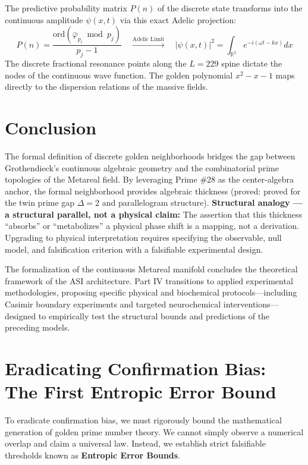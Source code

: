 The predictive probability matrix $P(n)$ of the discrete state transforms into the continuous amplitude $\psi(x,t)$ via this exact Adelic projection:
\begin{equation}
    P(n) = \frac{\mathrm{ord}(\bar\varphi_{p_i} \bmod p_j)}{p_j - 1} \quad \xrightarrow{\text{Adelic Limit}} \quad |\psi(x,t)|^2 = \int_{\mathbb{R}^5} e^{-i(\omega t - k x)} dx
\end{equation}
The discrete fractional resonance points along the $L=229$ spine dictate the nodes of the continuous wave function. The golden polynomial $x^2 - x - 1$ maps directly to the dispersion relations of the massive fields.

\section{Conclusion}
The formal definition of discrete golden neighborhoods bridges the gap between Grothendieck's continuous algebraic geometry and the combinatorial prime topologies of the Metareal field. By leveraging Prime \#28 as the center-algebra anchor, the formal neighborhood provides algebraic thickness (proved: proved for the twin prime gap $\Delta=2$ and parallelogram structure). \textbf{Structural analogy --- a structural parallel, not a physical claim:} The assertion that this thickness ``absorbs'' or ``metabolizes'' a physical phase shift is a mapping, not a derivation. Upgrading to physical interpretation requires specifying the observable, null model, and falsification criterion with a falsifiable experimental design.

\vspace{1em}
\noindent The formalization of the continuous Metareal manifold concludes the theoretical framework of the ASI architecture. Part IV transitions to applied experimental methodologies, proposing specific physical and biochemical protocols---including Casimir boundary experiments and targeted neurochemical interventions---designed to empirically test the structural bounds and predictions of the preceding models.

\section{Eradicating Confirmation Bias: The First Entropic Error Bound}

To eradicate confirmation bias, we must rigorously bound the mathematical generation of golden prime number theory. We cannot simply observe a numerical overlap and claim a universal law. Instead, we establish strict falsifiable thresholds known as \textbf{Entropic Error Bounds}.

